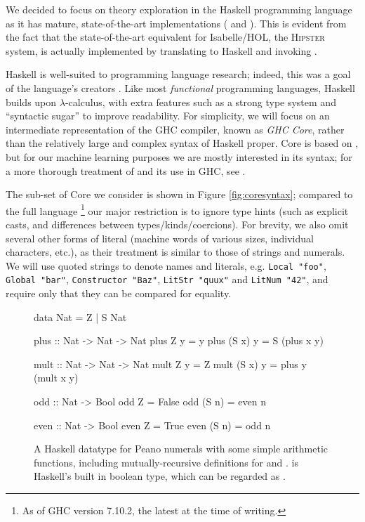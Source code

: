 We decided to focus on theory exploration in the Haskell programming language as it has mature, state-of-the-art implementations (\qspec{} \citep{QuickSpec} and \hspec{} \citep{claessen2013automating}). This is evident from the fact that the state-of-the-art equivalent for Isabelle/HOL, the \textsc{Hipster} \citep{Hipster} system, is actually implemented by translating to Haskell and invoking \hspec{}.

Haskell is well-suited to programming language research; indeed, this was a goal of the language's creators \citep{marlow2010haskell}. Like most \emph{functional} programming languages, Haskell builds upon $\lambda$-calculus, with extra features such as a strong type system and ``syntactic sugar'' to improve readability. For simplicity, we will focus on an intermediate representation of the \textsc{GHC} compiler, known as \emph{GHC Core}, rather than the relatively large and complex syntax of Haskell proper. Core is based on \fc{}, but for our machine learning purposes we are mostly interested in its syntax; for a more thorough treatment of \fc{} and its use in GHC, see \citep[Appendix C]{sulzmann2007system}.

The sub-set of Core we consider is shown in Figure \ref{fig:coresyntax}; compared to the full language \footnote{As of GHC version 7.10.2, the latest at the time of writing.} our major restriction is to ignore type hints (such as explicit casts, and differences between types/kinds/coercions). For brevity, we also omit several other forms of literal (machine words of various sizes, individual characters, etc.), as their treatment is similar to those of strings and numerals. We will use quoted strings to denote names and literals, e.g. \texttt{Local "foo"}, \texttt{Global "bar"}, \texttt{Constructor "Baz"}, \texttt{LitStr "quux"} and \texttt{LitNum "42"}, and require only that they can be compared for equality.

\begin{figure}
  \begin{haskell}
    data Nat = Z
             | S Nat

    plus :: Nat -> Nat -> Nat
    plus    Z  y = y
    plus (S x) y = S (plus x y)

    mult :: Nat -> Nat -> Nat
    mult    Z  y = Z
    mult (S x) y = plus y (mult x y)

    odd :: Nat -> Bool
    odd    Z  = False
    odd (S n) = even n

    even :: Nat -> Bool
    even    Z  = True
    even (S n) = odd n
  \end{haskell}
  \caption{A Haskell datatype for Peano numerals with some simple arithmetic functions, including mutually-recursive definitions for  and .  is Haskell's built in boolean type, which can be regarded as .}
  \label{fig:haskellexample}
\end{figure}

